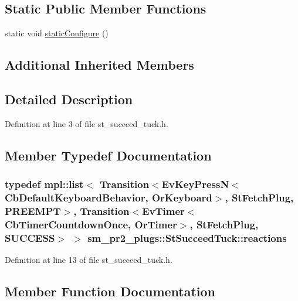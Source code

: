 \subsection*{Static Public Member Functions}
\begin{DoxyCompactItemize}
\item 
static void \hyperlink{structsm__pr2__plugs_1_1StSucceedTuck_a2578c44b2fa3443560def76f6d2bdef3}{static\+Configure} ()
\end{DoxyCompactItemize}
\subsection*{Additional Inherited Members}


\subsection{Detailed Description}


Definition at line 3 of file st\+\_\+succeed\+\_\+tuck.\+h.



\subsection{Member Typedef Documentation}
\subsubsection[{\texorpdfstring{reactions}{reactions}}]{\setlength{\rightskip}{0pt plus 5cm}typedef mpl\+::list$<$ Transition$<$Ev\+Key\+PressN$<$Cb\+Default\+Keyboard\+Behavior, {\bf Or\+Keyboard}$>$, {\bf St\+Fetch\+Plug}, {\bf P\+R\+E\+E\+M\+PT}$>$, Transition$<$Ev\+Timer$<$Cb\+Timer\+Countdown\+Once, {\bf Or\+Timer}$>$, {\bf St\+Fetch\+Plug}, {\bf S\+U\+C\+C\+E\+SS}$>$ $>$ {\bf sm\+\_\+pr2\+\_\+plugs\+::\+St\+Succeed\+Tuck\+::reactions}}\hypertarget{structsm__pr2__plugs_1_1StSucceedTuck_a5f4cdc033699ffd5e4c7f36e690d245a}{}\label{structsm__pr2__plugs_1_1StSucceedTuck_a5f4cdc033699ffd5e4c7f36e690d245a}


Definition at line 13 of file st\+\_\+succeed\+\_\+tuck.\+h.



\subsection{Member Function Documentation}
